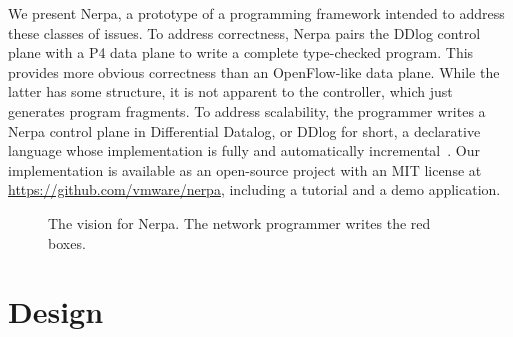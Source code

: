 \documentclass[sigconf, nonacm]{acmart}
\begin{document}
We present Nerpa, a prototype of a programming framework intended to address these classes of issues. To address correctness, Nerpa pairs the DDlog control plane with a P4 data plane to write a complete type-checked program. This provides more obvious correctness than an OpenFlow-like data plane. While the latter has some structure, it is not apparent to the controller, which just generates program fragments. To address scalability, the programmer writes a Nerpa control plane in Differential Datalog, or DDlog for short, a declarative language whose implementation is fully and automatically incremental~\cite{ryzhyk-datalog19}. Our implementation is available as an open-source project with an MIT license at \url{https://github.com/vmware/nerpa}, including a tutorial and a demo application.

\begin{figure}
    \centering
    \caption{The vision for Nerpa. The network programmer writes the red boxes. }
    \label{fig:nerpa-vision}
\end{figure}

\section{Design}
\end{document}
